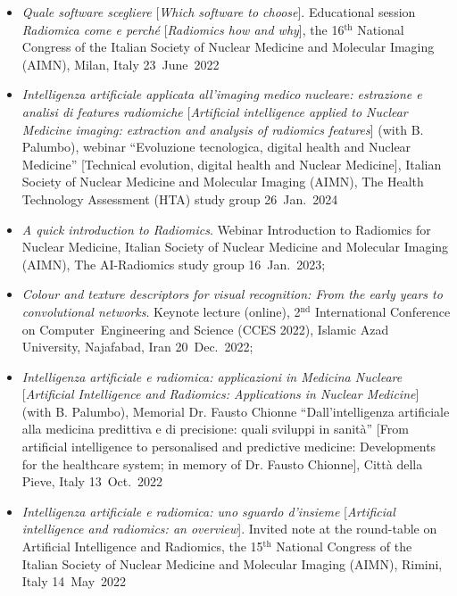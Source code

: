 \documentclass[11pt]{article}
\begin{document}
\begin{itemize}

\item \emph{Quale software scegliere} [\emph{Which software to choose}]. Educational session \emph{Radiomica come e perché} [\emph{Radiomics how and why}], the 16$^\text{th}$ National Congress of the Italian Society of Nuclear Medicine and Molecular Imaging (AIMN), Milan, Italy \hfill 23~June~2022

\item \emph{Intelligenza artificiale applicata all’imaging medico nucleare: estrazione e analisi di features radiomiche} [\emph{Artificial intelligence applied to Nuclear Medicine imaging: extraction and analysis of radiomics features}] (with B. Palumbo), webinar ``Evoluzione tecnologica, digital health and Nuclear Medicine'' [Technical evolution, digital health and Nuclear Medicine], Italian Society of Nuclear Medicine and Molecular Imaging (AIMN), The Health Technology Assessment (HTA) study group \hfill 26~Jan.~2024

\item \emph{A quick introduction to Radiomics}. Webinar Introduction to Radiomics for Nuclear Medicine, Italian Society of Nuclear Medicine and Molecular Imaging (AIMN), The AI-Radiomics study group \hfill 16~Jan.~2023;

\item \emph{Colour and texture descriptors for visual recognition: From the early years to convolutional networks}. Keynote lecture (online), 2$^\text{nd}$ International Conference on Computer Engineering and Science (CCES 2022), Islamic Azad University, Najafabad, Iran \hfill 20~Dec.~2022;

\item \emph{Intelligenza artificiale e radiomica: applicazioni in Medicina Nucleare} [\emph{Artificial Intelligence and Radiomics: Applications in Nuclear Medicine}] (with B. Palumbo), Memorial Dr. Fausto Chionne ``Dall'intelligenza artificiale alla medicina predittiva e di precisione: quali sviluppi in sanità'' [From artificial intelligence to personalised and predictive medicine: Developments for the healthcare system; in memory of Dr. Fausto Chionne], Città della Pieve, Italy \hfill 13~Oct.~2022

\item \emph{Intelligenza artificiale e radiomica: uno sguardo d'insieme} [\emph{Artificial intelligence and radiomics: an overview}]. Invited note at the round-table on Artificial Intelligence and Radiomics, the 15$^\text{th}$ National Congress of the Italian Society of Nuclear Medicine and Molecular Imaging (AIMN), Rimini, Italy \hfill 14~May~2022


\end{itemize}
\end{document}
